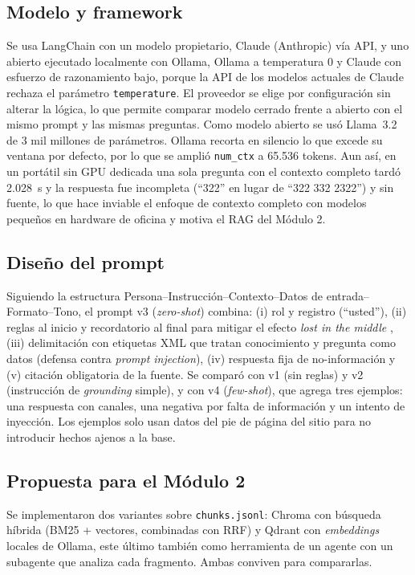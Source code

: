 \documentclass[journal]{IEEEtran}
\begin{document}
\subsection{Modelo y framework}
Se usa LangChain con un modelo propietario, Claude (Anthropic) vía API, y uno abierto ejecutado localmente con Ollama, Ollama a temperatura 0 y Claude con esfuerzo de razonamiento bajo, porque la API de los modelos actuales de Claude rechaza el parámetro \texttt{temperature}. El proveedor se elige por configuración sin alterar la lógica, lo que permite comparar modelo cerrado frente a abierto con el mismo prompt y las mismas preguntas. Como modelo abierto se usó Llama~3.2 de 3 mil millones de parámetros. Ollama recorta en silencio lo que excede su ventana por defecto, por lo que se amplió \texttt{num\_ctx} a 65.536 tokens. Aun así, en un portátil sin GPU dedicada una sola pregunta con el contexto completo tardó 2.028~s y la respuesta fue incompleta (``322'' en lugar de ``322 332 2322'') y sin fuente, lo que hace inviable el enfoque de contexto completo con modelos pequeños en hardware de oficina y motiva el RAG del Módulo 2.

\subsection{Diseño del prompt}
Siguiendo la estructura Persona--Instrucción--Contexto--Datos de entrada--Formato--Tono, el prompt v3 (\textit{zero-shot}) combina: (i) rol y registro (``usted''), (ii) reglas al inicio y recordatorio al final para mitigar el efecto \textit{lost in the middle} \cite{liu2024lost}, (iii) delimitación con etiquetas XML que tratan conocimiento y pregunta como datos (defensa contra \textit{prompt injection}), (iv) respuesta fija de no-información y (v) citación obligatoria de la fuente. Se comparó con v1 (sin reglas) y v2 (instrucción de \textit{grounding} simple), y con v4 (\textit{few-shot}), que agrega tres ejemplos: una respuesta con canales, una negativa por falta de información y un intento de inyección. Los ejemplos solo usan datos del pie de página del sitio para no introducir hechos ajenos a la base.

\subsection{Propuesta para el Módulo 2}
Se implementaron dos variantes sobre \texttt{chunks.jsonl}: Chroma con búsqueda híbrida (BM25 + vectores, combinadas con RRF) y Qdrant con \textit{embeddings} locales de Ollama, este último también como herramienta de un agente con un subagente que analiza cada fragmento. Ambas conviven para compararlas.
\end{document}
